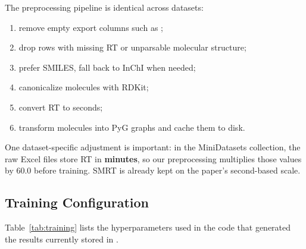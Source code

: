 The preprocessing pipeline is identical across datasets:

\begin{enumerate}
    \item remove empty export columns such as ;
    \item drop rows with missing RT or unparsable molecular structure;
    \item prefer SMILES, fall back to InChI when needed;
    \item canonicalize molecules with RDKit;
    \item convert RT to seconds;
    \item transform molecules into PyG graphs and cache them to disk.
\end{enumerate}

One dataset-specific adjustment is important: in the MiniDatasets collection, the raw Excel files store RT in \textbf{minutes}, so our preprocessing multiplies those values by \(60.0\) before training. SMRT is already kept on the paper's second-based scale.

\subsection{Training Configuration}

Table~\ref{tab:training} lists the hyperparameters used in the code that generated the results currently stored in .

\begin{table}[t]
    \centering
    \caption{Training settings used for the runs reported in this report. The MiniDataset stage uses direct SMRT-initialized transfer learning under a single shuffled split.}
    \label{tab:training}
\end{table}

